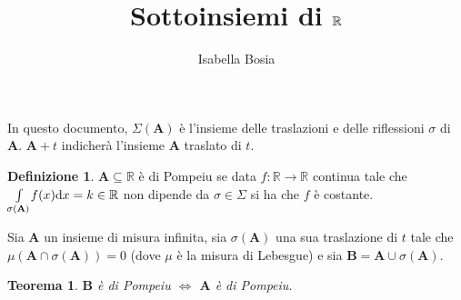 \documentclass[12pt]{article}
\title{Sottoinsiemi \pom{} di $\rea$}
\author{Isabella Bosia}
\date{}
\newcommand\rea{\mathbb R}
\newcommand\ins[1]{\mathbf #1}
\newcommand\pom{di Pompeiu}
\newcommand\intesx[2]{\int\limits_{#1}\!#2(x)\text dx}
\newtheorem{teo}{Teorema}
\theoremstyle{definition}
\newtheorem*{defn}{Definizione}
\begin{document}
\maketitle
In questo documento, $\Sigma(\ins A)$ è l'insieme delle traslazioni
e delle riflessioni $\sigma$ di $\ins A$.
$\ins A+t$ indicherà l'insieme $\ins A$ traslato di $t$. 
\begin{defn}
$\ins A\subseteq\rea$ è \pom{} se data $f:\rea\to\rea$ continua
tale che $\intesx {\sigma(\ins A)} f=k\in\rea$ non dipende da $\sigma\in\Sigma$
si ha che $f$ è costante.
\end{defn}

Sia $\ins A$ un insieme di misura infinita,
sia $\sigma(\ins A)$ una sua traslazione di $t$
tale che $\mu(\ins A\cap\sigma(\ins A))=0$
(dove $\mu$ è la misura di Lebesgue)
e sia $\ins B=\ins A\cup\sigma(\ins A)$.
\begin{teo}\label{teo:B-pom-sse-A-pom}$\ins B$ è \pom{} $\iff$ $\ins A$ è \pom{}.
\end{teo}
\end{document}
